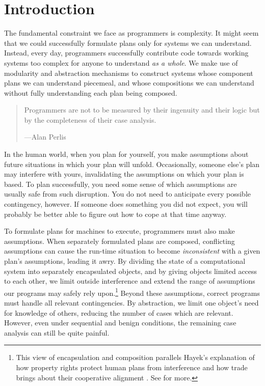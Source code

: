\documentclass{llncs}
\begin{document}
\section{Introduction}

The fundamental constraint we face as programmers is complexity. It
might seem that we could successfully formulate plans only for systems
we can understand. Instead, every day, programmers successfully
contribute code towards working systems too complex for anyone to
understand \emph{as a whole}. We make use of modularity and
abstraction mechanisms to construct systems whose component plans we
can understand piecemeal, and whose compositions we can understand
without fully understanding each plan being composed.
%
\begin{quote}
Programmers are not to be measured by their ingenuity and their logic
but by the completeness of their case analysis.
\begin{flushright}
---Alan Perlis
\end{flushright}
\end{quote}
%
In the human world, when you plan for yourself, you make assumptions
about future situations in which your plan will unfold. Occasionally,
someone else's plan may interfere with yours, invalidating the
assumptions on which your plan is based. To plan successfully, you
need some sense of which assumptions are usually safe from such
disruption. You do not need to anticipate every possible contingency,
however. If someone does something you did not expect, you will
probably be better able to figure out how to cope at that time anyway.

To formulate plans for machines to execute, programmers must also make
assumptions. When separately formulated plans are composed,
conflicting assumptions can cause the run-time situation to become
\emph{inconsistent} with a given plan's assumptions, leading it
awry. By dividing the state of a computational system into separately
encapsulated objects, and by giving objects limited access to each
other, we limit outside interference and extend the range of
assumptions our programs may safely rely upon.\footnote{
%
This view of encapsulation and composition parallels Hayek's
explanation of how property rights protect human plans from
interference and how trade brings about their cooperative alignment
\cite{Hayek:1945:UKS}. See \cite{miller:agoric,tulloh:abstraction} for
more.}
%
Beyond these assumptions, correct programs must handle all relevant
contingencies. By abstraction, we limit one object's need for
knowledge of others, reducing the number of cases which are
relevant. However, even under sequential and benign conditions, the
remaining case analysis can still be quite painful.
\end{document}

